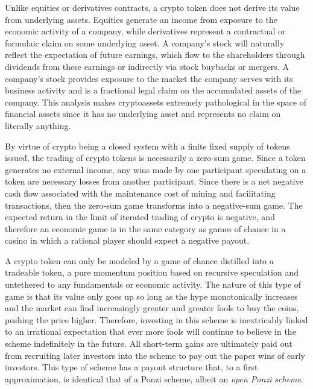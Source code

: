 
Unlike equities or derivatives contracts, a crypto token does not derive its
value from underlying assets. Equities generate an income from exposure to the
economic activity of a company, while derivatives represent a contractual or
formulaic claim on some underlying asset. A company's stock will naturally
reflect the expectation of future earnings, which flow to the shareholders
through dividends from these earnings or indirectly via stock buybacks or
mergers. A company's stock provides exposure to the market the company serves
with its business activity and is a fractional legal claim on the accumulated
assets of the company. This analysis makes cryptoassets extremely pathological
in the space of financial assets since it has no underlying asset and represents
no claim on literally anything.


By virtue of crypto being a closed system with a finite fixed supply of tokens
issued, the trading of crypto tokens is necessarily a zero-sum game. Since a
token generates no external income, any wins made by one participant speculating
on a token are necessary losses from another participant. Since there is a net
negative cash flow associated with the maintenance cost of mining and
facilitating transactions, then the zero-sum game transforms into a negative-sum
game. The expected return in the limit of iterated trading of crypto is
negative, and therefore an economic game is in the same category as games of
chance in a casino in which a rational player should expect a negative payout.


A crypto token can only be modeled by a game of chance distilled into a
tradeable token, a pure momentum position based on recursive speculation and
untethered to any fundamentals or economic activity. The nature of this type of
game is that its value only goes up so long as the hype monotonically increases
and the market can find increasingly greater and greater fools to buy the coins,
pushing the price higher. Therefore, investing in this scheme is inextricably
linked to an irrational expectation that ever more fools will continue to
believe in the scheme indefinitely in the future. All short-term gains are
ultimately paid out from recruiting later investors into the scheme to pay out
the paper wins of early investors. This type of scheme has a payout structure
that, to a first approximation, is identical that of a Ponzi scheme, albeit an
\textit{open Ponzi scheme}.


